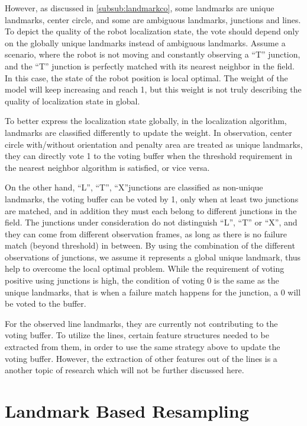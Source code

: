 However, as discussed in \autoref{subsub:landmarkco}, some landmarks are unique landmarks, \ie center circle, and some are ambiguous landmarks, \ie junctions and lines. To depict the quality of the robot localization state, the vote should depend only on the globally unique landmarks instead of ambiguous landmarks. Assume a scenario, where the robot is not moving and constantly observing a ``T'' junction, and the ``T'' junction is perfectly matched with its nearest neighbor in the field. In this case, the state of the robot position is local optimal. The weight of the model will keep increasing and reach 1, but this weight is not truly describing the quality of localization state in global. 

To better express the localization state globally, in the localization algorithm, landmarks are classified differently to update the weight. In observation, center circle with/without orientation and penalty area are treated as unique landmarks, they can directly vote 1 to the voting buffer when the threshold requirement in the nearest neighbor algorithm is satisfied, or vice versa. 

On the other hand, ``L'', ``T'', ``X''junctions are classified as non-unique landmarks, the voting buffer can be voted by 1, only when at least two junctions are matched, and in addition they must each belong to different junctions in the field. The junctions under consideration do not distinguish ``L'', ``T'' or ``X'', and they can come from different observation frames, as long as there is no failure match (beyond threshold) in between. By using the combination of the different observations of junctions, we assume it represents a global unique landmark, thus help to overcome the local optimal problem. While the requirement of voting positive using junctions is high, the condition of voting 0 is the same as the unique landmarks, that is when a failure match happens for the junction, a 0 will be voted to the buffer.  

For the observed line landmarks, they are currently not contributing to the voting buffer. To utilize the lines, certain feature structures needed to be extracted from them, in order to use the same strategy above to update the voting buffer. However, the extraction of other features out of the lines is a another topic of research which will not be further discussed here.


\section{Landmark Based Resampling}\label{sec:resample}

